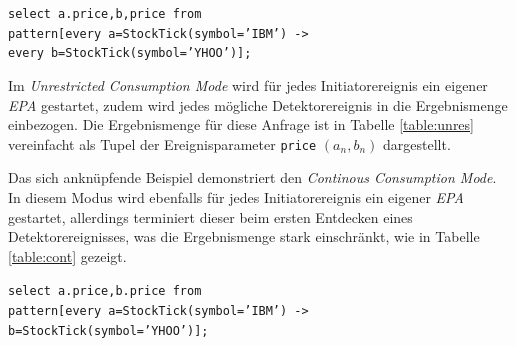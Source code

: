 \documentclass{acm_proc_article-sp}
\begin{document}
\texttt{select a.price,b,price from\\pattern[every a=StockTick(symbol='IBM') ->\\
every b=StockTick(symbol='YHOO')];}

Im \textit{Unrestricted Consumption Mode} wird für jedes Initiatorereignis ein eigener 
\textit{EPA} gestartet, zudem wird jedes mögliche Detektorereignis in die 
Ergebnismenge einbezogen. Die Ergebnismenge für diese Anfrage ist in Tabelle 
\ref{table:unres} vereinfacht als Tupel der Ereignisparameter \texttt{price} 
$(a_n,b_n)$ dargestellt. 


\begin{table}[ht]
    \caption{\textit{Unrestricted Consumption Mode}}
    \label{table:unres}\vspace{0.2cm}
\end{table}


Das sich anknüpfende Beispiel demonstriert den \textit{Continous Consumption Mode}. In 
diesem Modus wird ebenfalls für jedes Initiatorereignis ein eigener \textit{EPA} 
gestartet, allerdings terminiert dieser beim ersten Entdecken eines Detektorereignisses, 
was die Ergebnismenge stark einschränkt, wie in Tabelle \ref{table:cont} gezeigt.
 
\texttt{select a.price,b.price from\\pattern[every a=StockTick(symbol='IBM') ->\\
b=StockTick(symbol='YHOO')];}
\end{document}
